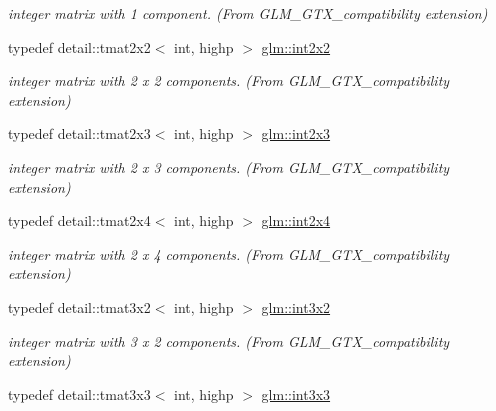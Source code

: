 \begin{DoxyCompactItemize}
\begin{DoxyCompactList}\small\item\em integer matrix with 1 component. (From G\+L\+M\+\_\+\+G\+T\+X\+\_\+compatibility extension) \end{DoxyCompactList}\item 
typedef detail\+::tmat2x2$<$ int, highp $>$ \hyperlink{group__gtx__compatibility_ga7762d2b809aab75003e7e7873ca74a2f}{glm\+::int2x2}\hypertarget{group__gtx__compatibility_ga7762d2b809aab75003e7e7873ca74a2f}{}\label{group__gtx__compatibility_ga7762d2b809aab75003e7e7873ca74a2f}

\begin{DoxyCompactList}\small\item\em integer matrix with 2 x 2 components. (From G\+L\+M\+\_\+\+G\+T\+X\+\_\+compatibility extension) \end{DoxyCompactList}\item 
typedef detail\+::tmat2x3$<$ int, highp $>$ \hyperlink{group__gtx__compatibility_ga42c3d6e4924de559104b9ca2b127c9ac}{glm\+::int2x3}\hypertarget{group__gtx__compatibility_ga42c3d6e4924de559104b9ca2b127c9ac}{}\label{group__gtx__compatibility_ga42c3d6e4924de559104b9ca2b127c9ac}

\begin{DoxyCompactList}\small\item\em integer matrix with 2 x 3 components. (From G\+L\+M\+\_\+\+G\+T\+X\+\_\+compatibility extension) \end{DoxyCompactList}\item 
typedef detail\+::tmat2x4$<$ int, highp $>$ \hyperlink{group__gtx__compatibility_ga145a388c0d988490d6ce901a664faf50}{glm\+::int2x4}\hypertarget{group__gtx__compatibility_ga145a388c0d988490d6ce901a664faf50}{}\label{group__gtx__compatibility_ga145a388c0d988490d6ce901a664faf50}

\begin{DoxyCompactList}\small\item\em integer matrix with 2 x 4 components. (From G\+L\+M\+\_\+\+G\+T\+X\+\_\+compatibility extension) \end{DoxyCompactList}\item 
typedef detail\+::tmat3x2$<$ int, highp $>$ \hyperlink{group__gtx__compatibility_ga2b1f3046fb4692c0c2f76b3933389868}{glm\+::int3x2}\hypertarget{group__gtx__compatibility_ga2b1f3046fb4692c0c2f76b3933389868}{}\label{group__gtx__compatibility_ga2b1f3046fb4692c0c2f76b3933389868}

\begin{DoxyCompactList}\small\item\em integer matrix with 3 x 2 components. (From G\+L\+M\+\_\+\+G\+T\+X\+\_\+compatibility extension) \end{DoxyCompactList}\item 
typedef detail\+::tmat3x3$<$ int, highp $>$ \hyperlink{group__gtx__compatibility_ga8773c9f240dcac9f28d1afef71f7f779}{glm\+::int3x3}\hypertarget{group__gtx__compatibility_ga8773c9f240dcac9f28d1afef71f7f779}{}\label{group__gtx__compatibility_ga8773c9f240dcac9f28d1afef71f7f779}


\end{DoxyCompactItemize}
